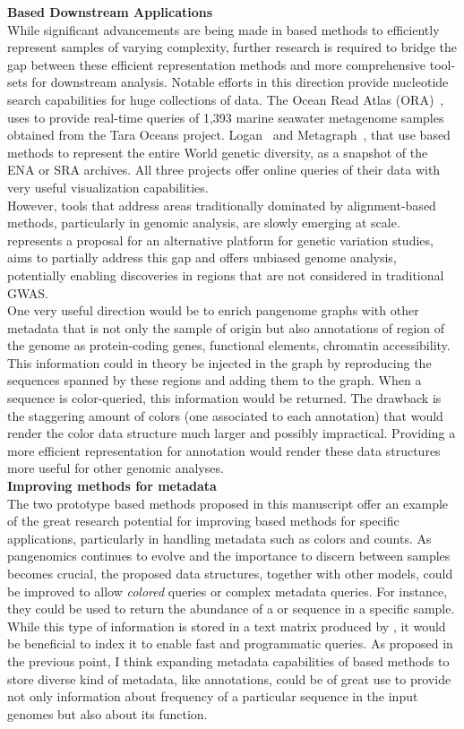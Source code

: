 \textbf{\kmer Based Downstream Applications}\\
While significant advancements are being made in \kmer based methods to efficiently represent samples of varying complexity, further research is required to bridge the gap between these efficient representation methods and more comprehensive tool-sets for downstream analysis.
Notable efforts in this direction provide nucleotide search capabilities for huge collections of data. The Ocean Read Atlas (ORA)~\cite{ora}, uses \kmt to provide real-time queries of 1,393 marine seawater metagenome samples obtained from the Tara Oceans project. Logan~\cite{logan} and Metagraph~\cite{metagraph}, that use \kmer based methods to represent the entire World genetic diversity, as a snapshot of the ENA or SRA archives. All three projects offer online queries of their data with very useful visualization capabilities.\\
However, tools that address areas traditionally dominated by alignment-based methods, particularly in genomic analysis, are slowly emerging at scale. \muset represents a proposal for an alternative platform for genetic variation studies, aims to partially address this gap and offers unbiased genome analysis, potentially enabling discoveries in regions that are not considered in traditional GWAS.\\ One very useful direction would be to enrich pangenome graphs with other metadata that is not only the sample of origin but also annotations of region of the genome as protein-coding genes, functional elements, chromatin accessibility. This information could in theory be injected in the graph by reproducing the sequences spanned by these regions and adding them to the graph. When a sequence is color-queried, this information would be returned. The drawback is the staggering amount of colors (one associated to each annotation) that would render the color data structure much larger and possibly impractical. Providing a more efficient representation for annotation would render these data structures more useful for other genomic analyses.\\
\textbf{Improving methods for metadata}\\
The two prototype \kmer based methods proposed in this manuscript offer an example of the great research potential for improving \kmer based methods for specific applications, particularly in handling metadata such as colors and counts.
As pangenomics continues to evolve and the importance to discern between samples becomes crucial, the proposed data structures, together with other models, could be improved to allow \emph{colored} queries or complex metadata queries. For instance, they could be used to return the abundance of a \kmer or sequence in a specific sample. While this type of information is stored in a text matrix produced by \muset, it would be beneficial to index it to enable fast and programmatic queries. As proposed in the previous point, I think expanding metadata capabilities of \kmer based methods to store diverse kind of metadata, like annotations, could be of great use to provide not only information about frequency of a particular sequence in the input genomes but also about its function.

\printbibliography